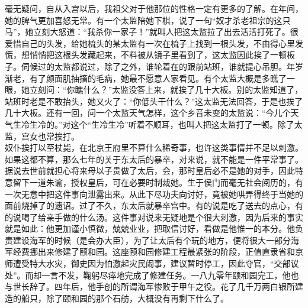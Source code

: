   毫无疑问，自从入宫以后，我祖父对于他那位的性格一定有更多的了解。在年间，她的脾气更加喜怒无常。有一个太监陪她下棋，说了一句“奴才杀老祖宗的这只马”，她立刻大怒道：“我杀你一家子！”就叫人把这太监拉了出去活活打死了。很爱惜自己的头发，给她梳头的某太监有一次在梳子上找到一根头发，不由得心里发慌，想悄悄把这根头发藏起来，不料被从镜子里看到了，这太监因此挨了一顿板子。伺候过的太监都说过，除了之外，谁轮着在的跟前站班，谁就提心吊胆。年岁渐老，有了颜面肌抽搐的毛病，她最不愿意人家看见。有个太监大概是多瞧了一眼，她立刻问：“你瞧什么？”太监没答上来，就挨了几十大板。别的太监知道了，站班时老是不敢抬头，她又火了：“你低头干什么？”这太监无法回答，于是也挨了几十大板。还有一回，问一个太监天气怎样，这个乡音未变的太监说：“今儿个天气生冷生冷的。”对这个“生冷生冷”听着不顺耳，也叫人把这太监打了一顿。除了太监，宫女也常挨打。\\

  奴仆挨打以至杖毙，在北京王府里不算什么稀奇事，也许这类事情并不足以刺激。如果这都不算，那么七年的关于东太后的暴卒，对来说，就不能是一件平常事了。据说去世前就担心将来母以子贵做了太后，会，那时皇后必不是她的对手，因此特意留下一道朱谕，授权皇后，可在必要时制裁她。生于侯门而毫无社会阅历的，有一次无意中把这件事向泄露出来。从此下尽功夫向讨好，竟被她哄弄得终于当她的面前烧掉了的遗诏。过了不久，东太后就暴卒宫中。有的说是吃了送去的点心，有的说喝了给亲手做的什么汤。这件事对说来无疑地是个很大刺激，因为后来的事实就是如此：他更加谨小慎微，兢兢业业，把取信讨好，看做是他惟一的本分。他负责建设海军的时候（是会办大臣），为了让太后有个玩的地方，便将很大一部分海军经费挪出来修建了颐和园。这座颐和园修建工程最紧张的阶段，正值直隶省和京师遭受特大水灾，御史因为怕激起灾民闹事，建议暂时停工，因此夺官，“交部议处”。而却一言不发，鞠躬尽瘁地完成了修建任务。一八九零年颐和园完工，他也与世长辞了。四年后，他手创的所谓海军惨败于甲午之役。花了几千万两白银所建造的船只，除了颐和园的那个石舫，大概没有再剩下什么了。
